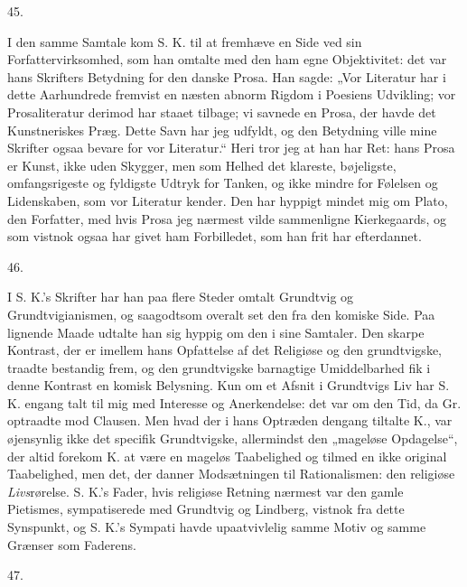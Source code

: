 \documentclass[12pt,a4paper,openany]{book}
\newcommand{\secnum}[1]{\par\begin{center}#1\end{center}\par\nobreak}
\newcommand{\opage}[1]{\marginnote{\footnotesize\textit{[#1]}}}
\begin{document}
\secnum{45.}

I den samme Samtale kom S. K. til at fremhæve en Side ved sin
Forfattervirksomhed, som han omtalte med den ham egne Objektivitet: det var
hans Skrifters Betydning for den danske Prosa. Han sagde: „Vor Literatur har
i dette Aarhundrede fremvist en næsten abnorm Rigdom i Poesiens Udvikling; vor
Prosaliteratur derimod har staaet tilbage; vi savnede en Prosa, der havde det
Kunstneriskes Præg. Dette Savn har jeg udfyldt, og den Betydning ville mine
Skrifter ogsaa bevare for vor Literatur.“ Heri tror jeg at han har Ret: hans
Prosa er Kunst, ikke uden Skygger, men som Helhed det klareste,
\opage{370}bøjeligste, omfangsrigeste og fyldigste Udtryk for Tanken, og ikke
mindre for Følelsen og Lidenskaben, som vor Literatur kender. Den har hyppigt
mindet mig om Plato, den Forfatter, med hvis Prosa jeg nærmest vilde
sammenligne Kierkegaards, og som vistnok ogsaa har givet ham Forbilledet, som
han frit har efterdannet.

\secnum{46.}

I S. K.’s Skrifter har han paa flere Steder omtalt Grundtvig og
Grundtvigianismen, og saagodtsom overalt set den fra den komiske Side. Paa
lignende Maade udtalte han sig hyppig om den i sine Samtaler. Den skarpe
Kontrast, der er imellem hans Opfattelse af det Religiøse og den grundtvigske,
traadte bestandig frem, og den grundtvigske barnagtige Umiddelbarhed fik i
denne Kontrast en komisk Belysning. Kun om et Afsnit i Grundtvigs Liv har
S. K. engang talt til mig med Interesse og Anerkendelse: det var om den Tid,
da Gr. optraadte mod Clausen. Men hvad der i hans Optræden dengang tiltalte
K., var øjensynlig ikke det specifik Grundtvigske, allermindst den „mageløse
Opdagelse“, der altid forekom K. at være en mageløs Taabelighed og tilmed en
ikke original Taabelighed, men det, der danner Modsætningen til Rationalismen:
den religiøse \emph{Livs}rørelse. S. K.’s Fader, hvis religiøse Retning
nærmest var den gamle Pietismes, sympatiserede med Grundtvig og Lindberg,
vistnok fra dette Synspunkt, og S. K.’s Sympati havde upaatvivlelig samme
Motiv og samme Grænser som Faderens.

\secnum{47.}
\end{document}
